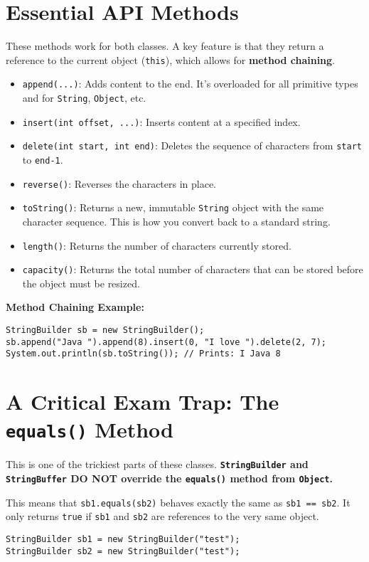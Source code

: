 \documentclass[12pt]{article}
\begin{document}
\begin{enumerate}[label=(\arabic*)]
\section{Essential API Methods}
These methods work for both classes. A key feature is that they return a reference to the current object (\texttt{this}), which allows for \textbf{method chaining}.
\begin{itemize}
    \item \texttt{append(...)}: Adds content to the end. It's overloaded for all primitive types and for \texttt{String}, \texttt{Object}, etc.
    \item \texttt{insert(int offset, ...)}: Inserts content at a specified index.
    \item \texttt{delete(int start, int end)}: Deletes the sequence of characters from \texttt{start} to \texttt{end-1}.
    \item \texttt{reverse()}: Reverses the characters in place.
    \item \texttt{toString()}: Returns a new, immutable \texttt{String} object with the same character sequence. This is how you convert back to a standard string.
    \item \texttt{length()}: Returns the number of characters currently stored.
    \item \texttt{capacity()}: Returns the total number of characters that can be stored before the object must be resized.
\end{itemize}

\textbf{Method Chaining Example:}
\begin{verbatim}
StringBuilder sb = new StringBuilder();
sb.append("Java ").append(8).insert(0, "I love ").delete(2, 7);
System.out.println(sb.toString()); // Prints: I Java 8
\end{verbatim}

\section{A Critical Exam Trap: The \texttt{equals()} Method}
This is one of the trickiest parts of these classes. \textbf{\texttt{StringBuilder} and \texttt{StringBuffer} DO NOT override the \texttt{equals()} method from \texttt{Object}.}

This means that \texttt{sb1.equals(sb2)} behaves exactly the same as \texttt{sb1 == sb2}. It only returns \texttt{true} if \texttt{sb1} and \texttt{sb2} are references to the very same object.

\begin{verbatim}
StringBuilder sb1 = new StringBuilder("test");
StringBuilder sb2 = new StringBuilder("test");


\end{verbatim}
\end{enumerate}
\end{document}
